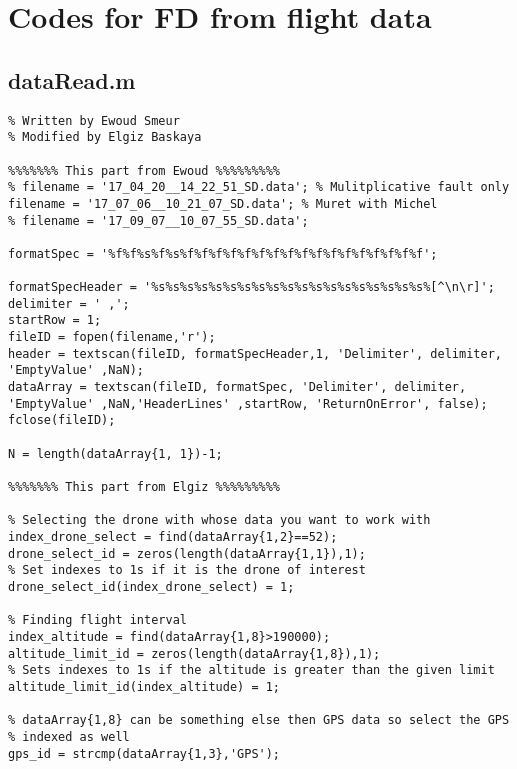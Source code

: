 \chapter{Codes for FD from flight data}


\section{dataRead.m}
\begin{lstlisting}
% Written by Ewoud Smeur 
% Modified by Elgiz Baskaya

%%%%%%% This part from Ewoud %%%%%%%%%
% filename = '17_04_20__14_22_51_SD.data'; % Mulitplicative fault only
filename = '17_07_06__10_21_07_SD.data'; % Muret with Michel
% filename = '17_09_07__10_07_55_SD.data'; 

formatSpec = '%f%f%s%f%s%f%f%f%f%f%f%f%f%f%f%f%f%f%f%f%f%f';

formatSpecHeader = '%s%s%s%s%s%s%s%s%s%s%s%s%s%s%s%s%s%s%s%[^\n\r]';
delimiter = ' ,';
startRow = 1;
fileID = fopen(filename,'r');
header = textscan(fileID, formatSpecHeader,1, 'Delimiter', delimiter, 'EmptyValue' ,NaN);
dataArray = textscan(fileID, formatSpec, 'Delimiter', delimiter, 'EmptyValue' ,NaN,'HeaderLines' ,startRow, 'ReturnOnError', false);
fclose(fileID);
 
N = length(dataArray{1, 1})-1;

%%%%%%% This part from Elgiz %%%%%%%%%

% Selecting the drone with whose data you want to work with
index_drone_select = find(dataArray{1,2}==52);
drone_select_id = zeros(length(dataArray{1,1}),1);
% Set indexes to 1s if it is the drone of interest
drone_select_id(index_drone_select) = 1;

% Finding flight interval
index_altitude = find(dataArray{1,8}>190000);
altitude_limit_id = zeros(length(dataArray{1,8}),1);
% Sets indexes to 1s if the altitude is greater than the given limit
altitude_limit_id(index_altitude) = 1;

% dataArray{1,8} can be something else then GPS data so select the GPS 
% indexed as well
gps_id = strcmp(dataArray{1,3},'GPS');


\end{lstlisting}

